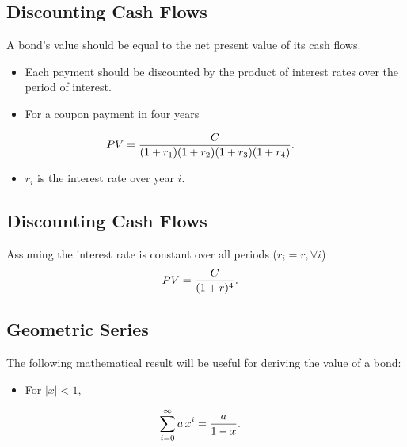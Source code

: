 \documentclass[letterpaper,10pt,english]{sphinxmanual}
\begin{document}
\subsection{Discounting Cash Flows}
\label{bondPrices:discounting-cash-flows}
A bond's value should be equal to the net present value of its cash flows.
\begin{itemize}
\item {} 
Each payment should be discounted by the product of interest rates
over the period of interest.

\end{itemize}
\begin{itemize}
\item {} 
For a coupon payment in four years

\end{itemize}
\begin{gather}
\begin{split}PV & = \frac{C}{(1+r_1)(1+r_2)(1+r_3)(1+r_4)}.\end{split}\notag
\end{gather}\begin{itemize}
\item {} 
$r_i$ is the interest rate over year $i$.

\end{itemize}


\subsection{Discounting Cash Flows}
\label{bondPrices:id6}
Assuming the interest rate is constant over all periods ($r_i =
r, \forall i$)
\begin{gather}
\begin{split}PV & = \frac{C}{(1+r)^4}.\end{split}\notag
\end{gather}

\subsection{Geometric Series}
\label{bondPrices:geometric-series}
The following mathematical result will be useful for deriving the
value of a bond:
\begin{itemize}
\item {} 
For $|x| < 1$,

\end{itemize}
\begin{gather}
\begin{split}\sum_{i=0}^{\infty} a \, x^i & = \frac{a}{1-x}.\end{split}\notag
\end{gather}
\end{document}
